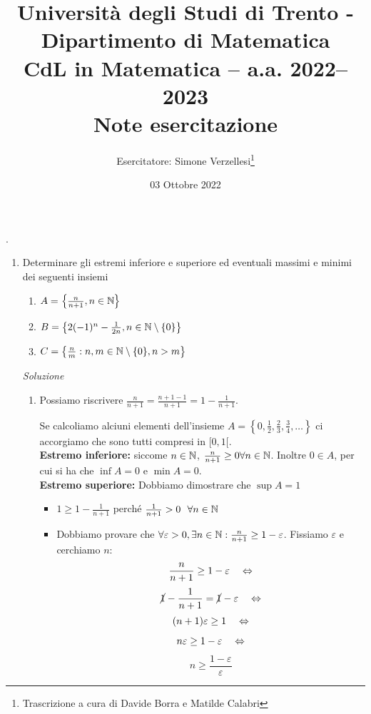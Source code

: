 \documentclass{article}
\title{Università degli Studi di Trento - Dipartimento di Matematica\\
CdL in Matematica – a.a. 2022–2023\\ Note esercitazione}
\author{Esercitatore: Simone Verzellesi\thanks{Trascrizione a cura di Davide Borra e Matilde Calabri}}
\date{03 Ottobre 2022}
\begin{document}
\maketitle
{}
\setlength{\headheight}{30pt}.
\begin{enumerate}[label=\textbf{Esercizio 3.\arabic*.},itemindent=*]
    \item Determinare gli estremi inferiore e superiore ed eventuali massimi e minimi dei seguenti insiemi 
    \begin{enumerate}
        \item $A=\left\{\frac{n}{n+1},n\in \mathbb{N}\right\}$
        \item $B=\left\{2(-1)^n-\frac{1}{2n}, n\in \mathbb{N}\setminus \{0\}\right\}$
        \item $C=\left\{\frac{n}{m}: n, m\in \mathbb{N}\setminus\{0\},n>m\right\}$
    \end{enumerate}
    \item[\textit{\large Soluzione~}]~
    \begin{enumerate}
        \item \begin{oss}
            Possiamo riscrivere $\frac{n}{n+1}=\frac{n+1-1}{n+1}=1-\frac{1}{n+1}$.
        \end{oss}
        Se calcoliamo alciuni elementi dell'insieme $A=\left\{0, \frac{1}{2}, \frac{2}{3}, \frac{3}{4},\dots\right\}$ ci accorgiamo che sono tutti compresi in $[0,1[$.\\
        \textbf{Estremo inferiore:} siccome $n\in \mathbb{N}$, $\frac{n}{n+1}\geq0\forall n\in \mathbb{N}$. Inoltre $0\in A$, per cui si ha che $\inf A=0$ e $\min A=0$.\\
        \textbf{Estremo superiore:} Dobbiamo dimostrare che $\sup A=1$
        \begin{itemize}
            \item $1\geq 1-\frac{1}{n+1}$ perché $\frac{1}{n+1}>0~~\forall n\in \mathbb{N}$
            \item Dobbiamo provare che $\forall \varepsilon >0, \exists n\in \mathbb{N}:\frac{n}{n+1}\geq 1-\varepsilon$. Fissiamo $\varepsilon$ e cerchiamo $n$: \[\frac{n}{n+1}\geq 1-\varepsilon~~~\Leftrightarrow\]\[\cancel{1}-\frac{1}{n+1}=\cancel{1}-\varepsilon~~~\Leftrightarrow\]\[(n+1)\varepsilon\geq 1~~~\Leftrightarrow\]\[n\varepsilon\geq 1-\varepsilon ~~~\Leftrightarrow\]\[n\geq \frac{1-\varepsilon}{\varepsilon}\]

\end{itemize}
\end{enumerate}
\end{enumerate}
\end{document}

